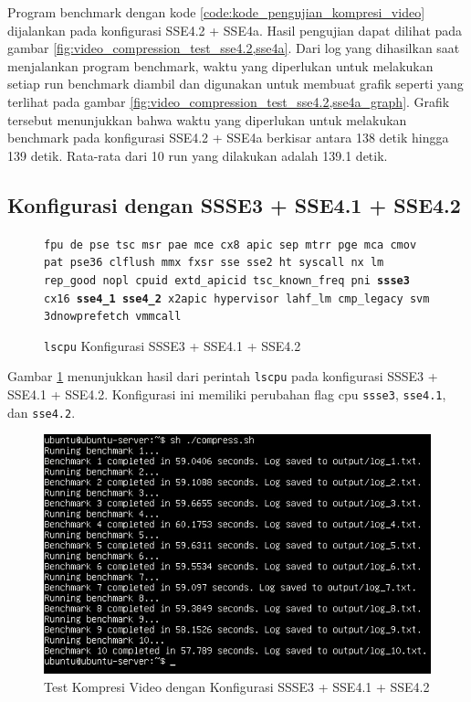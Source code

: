 Program benchmark dengan kode \ref{code:kode_pengujian_kompresi_video} dijalankan pada konfigurasi SSE4.2 + SSE4a. Hasil pengujian dapat dilihat pada gambar \ref{fig:video_compression_test_sse4.2,sse4a}. Dari log yang dihasilkan saat menjalankan program benchmark, waktu yang diperlukan untuk melakukan setiap run benchmark diambil dan digunakan untuk membuat grafik seperti yang terlihat pada gambar \ref{fig:video_compression_test_sse4.2,sse4a_graph}. Grafik tersebut menunjukkan bahwa waktu yang diperlukan untuk melakukan benchmark pada konfigurasi SSE4.2 + SSE4a berkisar antara 138 detik hingga 139 detik. Rata-rata dari 10 run yang dilakukan adalah 139.1 detik.

\subsection{Konfigurasi dengan SSSE3 + SSE4.1 + SSE4.2}
\begin{figure}
    \texttt{fpu de pse tsc msr pae mce cx8 apic sep mtrr pge mca cmov pat pse36 clflush mmx fxsr sse sse2 ht syscall nx lm rep\_good nopl cpuid extd\_apicid tsc\_known\_freq pni \textbf{ssse3} cx16 \textbf{sse4\_1} \textbf{sse4\_2} x2apic hypervisor lahf\_lm cmp\_legacy svm 3dnowprefetch vmmcall}
    \caption{\texttt{lscpu} Konfigurasi SSSE3 + SSE4.1 + SSE4.2}
    \label{fig:lscpu_video_compression_test_ssse3,sse4.1,sse4.2}
\end{figure}

Gambar \ref{fig:lscpu_video_compression_test_ssse3,sse4.1,sse4.2} menunjukkan hasil dari perintah \texttt{lscpu} pada konfigurasi SSSE3 + SSE4.1 + SSE4.2. Konfigurasi ini memiliki perubahan flag cpu \texttt{ssse3}, \texttt{sse4.1}, dan \texttt{sse4.2}.

\begin{figure}
    \centering
    \includegraphics[width=1\textwidth]
    {assets/pics/video-compression-test/ssse3,sse4.1,sse4.2.jpeg}
    \caption{Test Kompresi Video dengan Konfigurasi SSSE3 + SSE4.1 + SSE4.2}
    \label{fig:video_compression_test_ssse3,sse4.1,sse4.2}
\end{figure}

